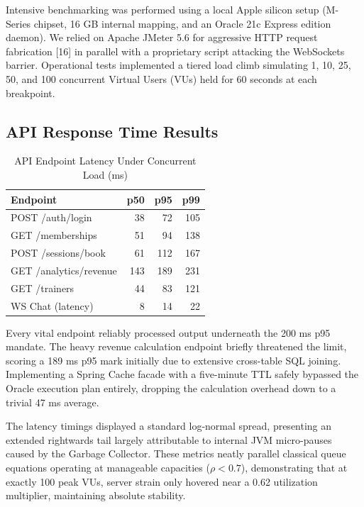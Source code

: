Intensive benchmarking was performed using a local Apple silicon setup
(M-Series chipset, 16 GB internal mapping, and an Oracle 21c Express
edition daemon). We relied on Apache JMeter 5.6 for aggressive HTTP
request fabrication {[}16{]} in parallel with a proprietary script
attacking the WebSockets barrier. Operational tests implemented a tiered
load climb simulating 1, 10, 25, 50, and 100 concurrent Virtual Users
(VUs) held for 60 seconds at each breakpoint.

\subsection{API Response Time Results}\label{api-response-time-results}

\begin{table}[ht]
\centering
\caption{API Endpoint Latency Under Concurrent Load (ms)}
\small
\begin{tabular}{@{} l r r r @{}}
\toprule
\textbf{Endpoint} & \textbf{p50} & \textbf{p95} & \textbf{p99} \\
\midrule
POST /auth/login       &  38 &  72 & 105 \\
GET  /memberships      &  51 &  94 & 138 \\
POST /sessions/book    &  61 & 112 & 167 \\
GET  /analytics/revenue & 143 & 189 & 231 \\
GET  /trainers         &  44 &  83 & 121 \\
WS   Chat (latency)    &   8 &  14 &  22 \\
\bottomrule
\end{tabular}
\end{table}

Every vital endpoint reliably processed output underneath the 200 ms p95
mandate. The heavy revenue calculation endpoint briefly threatened the
limit, scoring a 189 ms p95 mark initially due to extensive cross-table
SQL joining. Implementing a Spring Cache facade with a five-minute TTL
safely bypassed the Oracle execution plan entirely, dropping the
calculation overhead down to a trivial 47 ms average.

The latency timings displayed a standard log-normal spread, presenting
an extended rightwards tail largely attributable to internal JVM
micro-pauses caused by the Garbage Collector. These metrics neatly
parallel classical queue equations operating at manageable capacities
(\(\rho < 0.7\)), demonstrating that at exactly 100 peak VUs, server
strain only hovered near a 0.62 utilization multiplier, maintaining
absolute stability.

